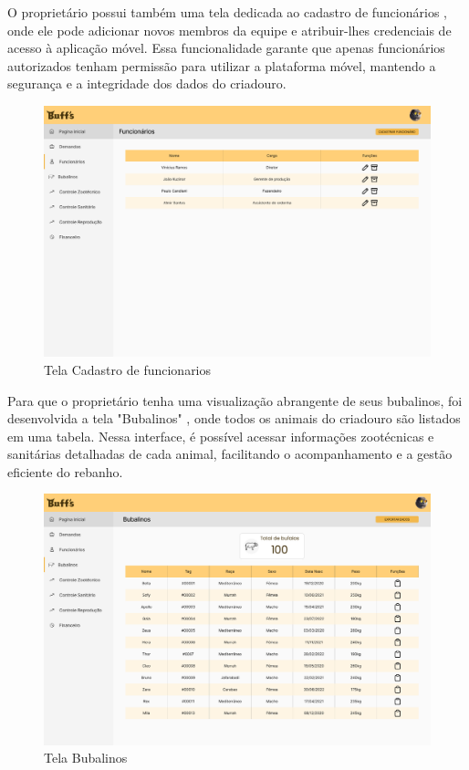 O proprietário possui também uma tela dedicada ao cadastro de funcionários , onde ele pode adicionar novos membros da equipe e atribuir-lhes credenciais de acesso à aplicação móvel. Essa funcionalidade garante que apenas funcionários autorizados tenham permissão para utilizar a plataforma móvel, mantendo a segurança e a integridade dos dados do criadouro.

\begin{figure}[!h]
\centering
\caption{Tela Cadastro de funcionarios}%
\label{fig:ux-pc03}
\includegraphics[scale=0.3]{Illustrations/UX-PC/Pc-03.png}
\end{figure}

Para que o proprietário tenha uma visualização abrangente de seus bubalinos, foi desenvolvida a tela "Bubalinos" , onde todos os animais do criadouro são listados em uma tabela. Nessa interface, é possível acessar informações zootécnicas e sanitárias detalhadas de cada animal, facilitando o acompanhamento e a gestão eficiente do rebanho.

\newpage
\begin{figure}[!h]
\centering
\caption{Tela Bubalinos}%
\label{fig:ux-pc04}
\includegraphics[scale=0.28]{Illustrations/UX-PC/Pc-04.png}
\end{figure}

